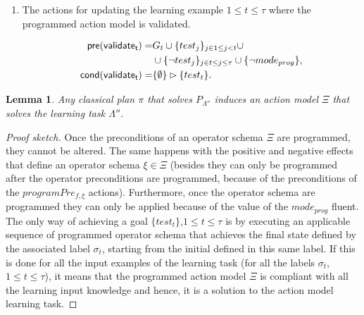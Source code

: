 \documentclass[letterpaper]{article} %
\newcommand{\pre}{\mathsf{pre}}     %
\newcommand{\cond}{\mathsf{cond}}   %
\newtheorem{lemma}[theorem]{Lemma}
\begin{document}
\begin{itemize}
\begin{enumerate}
\item The actions for updating the learning example {\tt\small $1\leq t\leq \tau$} where the programmed action model is validated. 
\begin{small}
\begin{align*}
\hspace*{7pt}\pre(\mathsf{validate_{t}})=&G_t\cup\{test_j\}_{j\in 1\leq j<t}\cup\\
&\cup\{\neg test_j\}_{j\in t\leq j\leq \tau}\cup \{\neg mode_{prog}\},\\
\cond(\mathsf{validate_{t}})=&\{\emptyset\}\rhd\{test_t\}.
\end{align*}
\end{small}
\end{enumerate}
\end{itemize}


\begin{lemma}
Any classical plan $\pi$ that solves $P_{\Lambda''}$ induces an action model $\Xi$ that solves the learning task $\Lambda''$.
\end{lemma}

\begin{proof}[Proof sketch]
Once the preconditions of an operator schema $\Xi$ are programmed, they cannot be altered. The same happens with the positive and negative effects that define an operator schema $\xi \in \Xi$ (besides they can only be programmed after the operator preconditions are programmed, because of the preconditions of the $programPre_{f,\xi}$ actions). Furthermore, once the operator schema are programmed they can only be applied because of the value of the $mode_{prog}$ fluent. The only way of achieving a goal $\{test_t\}$,{\small $1\leq t\leq \tau$} is by executing an applicable sequence of programmed operator schema that achieves the final state defined by the associated label $\sigma_t$, starting from the initial defined in this same label. If this is done for all the input examples of the learning task (for all the labels $\sigma_t$, {\small $1\leq t\leq \tau$}), it means that the programmed action model $\Xi$ is compliant with all the learning input knowledge and hence, it is a solution to the action model learning task.
\end{proof}
\end{document}
